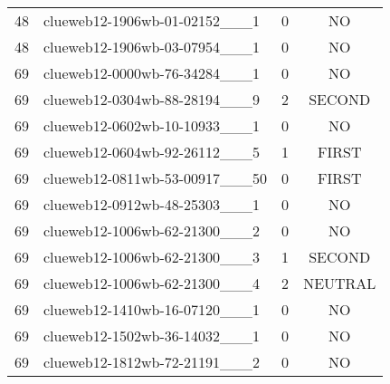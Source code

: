 \begin{table}
\begin{tabular}{clcc}
        48 & clueweb12-1906wb-01-02152\_\_\_1 & 0 & NO \\
        48 & clueweb12-1906wb-03-07954\_\_\_1 & 0 & NO \\
        \midrule
        69 & clueweb12-0000wb-76-34284\_\_\_1 & 0 & NO \\
        69 & clueweb12-0304wb-88-28194\_\_\_9 & 2 & SECOND \\
        69 & clueweb12-0602wb-10-10933\_\_\_1 & 0 & NO \\
        69 & clueweb12-0604wb-92-26112\_\_\_5 & 1 & FIRST \\
        69 & clueweb12-0811wb-53-00917\_\_\_50 & 0 & FIRST \\
        69 & clueweb12-0912wb-48-25303\_\_\_1 & 0 & NO \\
        69 & clueweb12-1006wb-62-21300\_\_\_2 & 0 & NO \\
        69 & clueweb12-1006wb-62-21300\_\_\_3 & 1 & SECOND \\
        69 & clueweb12-1006wb-62-21300\_\_\_4 & 2 & NEUTRAL \\
        69 & clueweb12-1410wb-16-07120\_\_\_1 & 0 & NO \\
        69 & clueweb12-1502wb-36-14032\_\_\_1 & 0 & NO \\
        69 & clueweb12-1812wb-72-21191\_\_\_2 & 0 & NO \\
        \bottomrule
    \end{tabular}
\end{table}